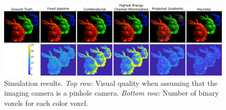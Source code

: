 \begin{figure}[ht!]
\centering
\includegraphics[width=0.99\columnwidth]{images/volumetric/acd_exp2/exp_pinhole}
\caption[Adaptive color decomposition: pinhole-camera reconstruction and number of binary voxels]{Simulation results. \emph{Top row:} Visual quality when assuming that the imaging camera is a pinhole camera. \emph{Bottom row:} Number of binary voxels for each color voxel.}
\label{fig:volumetric:acd:exp2:pinhole}
\end{figure}

